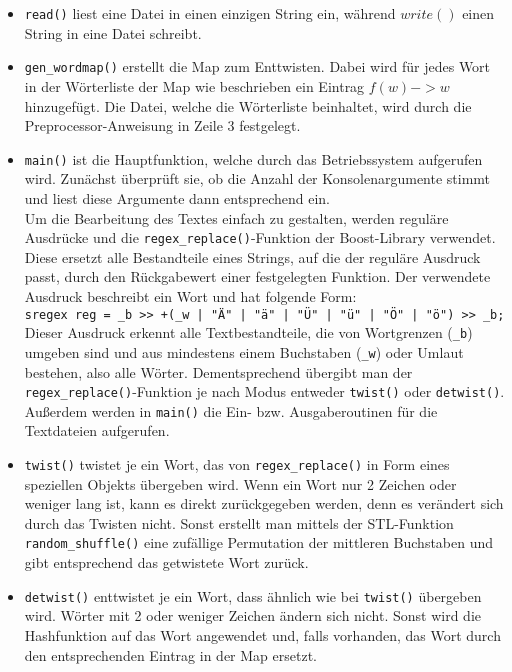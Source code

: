 \documentclass[a4paper, notitlepage, 12pt]{scrartcl}
\begin{document}
\begin{itemize}
	\item \texttt{read()} liest eine Datei in einen einzigen String ein, während $write()$ einen String in eine Datei schreibt.
	\item \texttt{gen\_wordmap()} erstellt die Map zum Enttwisten. Dabei wird für jedes Wort in der Wörterliste der Map wie beschrieben ein Eintrag $f(w) -> w$ hinzugefügt. Die Datei, welche die Wörterliste beinhaltet, wird durch die Preprocessor-Anweisung in Zeile 3 festgelegt.
	\item  \texttt{main()} ist die Hauptfunktion, welche durch das Betriebssystem aufgerufen wird. Zunächst überprüft sie, ob die Anzahl der Konsolenargumente stimmt und liest diese Argumente dann entsprechend ein. \\
	Um die Bearbeitung des Textes einfach zu gestalten, werden reguläre Ausdrücke und die \texttt{regex\_replace()}-Funktion der Boost-Library verwendet. Diese ersetzt alle Bestandteile eines Strings, auf die der reguläre Ausdruck passt, durch den Rückgabewert einer festgelegten Funktion.
	Der verwendete Ausdruck beschreibt ein Wort und hat folgende Form: \\
	\texttt{sregex reg = _b >> +(_w | "Ä" | "ä" | "Ü" | "ü" | "Ö" | "ö") >> _b;} \\
	Dieser Ausdruck erkennt alle Textbestandteile, die von Wortgrenzen (\texttt{\_b}) umgeben sind und aus mindestens einem Buchstaben (\texttt{\_w}) oder Umlaut bestehen, also alle Wörter.
	Dementsprechend übergibt man der \texttt{regex\_replace()}-Funktion je nach Modus entweder \texttt{twist()} oder \texttt{detwist()}. Außerdem werden in \texttt{main()} die Ein- bzw. Ausgaberoutinen für die Textdateien aufgerufen.
	\item \texttt{twist()} twistet je ein Wort, das von \texttt{regex\_replace()} in Form eines speziellen Objekts übergeben wird. Wenn ein Wort nur 2 Zeichen oder weniger lang ist, kann es direkt zurückgegeben werden, denn es verändert sich durch das Twisten nicht. Sonst erstellt man mittels der STL-Funktion \texttt{random\_shuffle()} eine zufällige Permutation der mittleren Buchstaben und gibt entsprechend das getwistete Wort zurück.
	\item \texttt{detwist()} enttwistet je ein Wort, dass ähnlich wie bei \texttt{twist()} übergeben wird. Wörter mit 2 oder weniger Zeichen ändern sich nicht. Sonst wird die Hashfunktion auf das Wort angewendet und, falls vorhanden, das Wort durch den entsprechenden Eintrag in der Map ersetzt.
\end{itemize}
\end{document}
